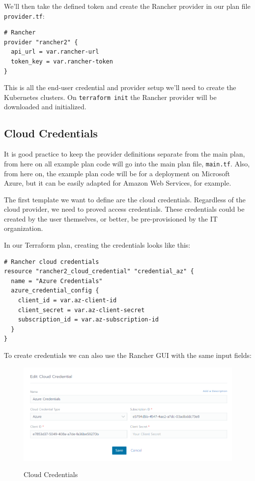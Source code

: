We'll then take the defined token and create the Rancher provider in our plan file \verb|provider.tf|:

\begin{lstlisting}[caption=Rancher Provider, frame=single, basicstyle=\ttfamily]
# Rancher
provider "rancher2" {
  api_url = var.rancher-url
  token_key = var.rancher-token
}
\end{lstlisting}

This is all the end-user credential and provider setup we'll need to create the Kubernetes clusters. On \verb|terraform init| the Rancher provider will be downloaded and initialized. 

\subsection{Cloud Credentials}

It is good practice to keep the provider definitions separate from the main plan, from here on all example plan code will go into the main plan file, \verb|main.tf|. Also, from here on, the example plan code will be for a deployment on Microsoft Azure, but it can be easily adapted for Amazon Web Services, for example.

The first template we want to define are the cloud credentials. Regardless of the cloud provider, we need to proved access credentials. These credentials could be created by the user themselves, or better, be pre-provisioned by the IT organization.

In our Terraform plan, creating the credentials looks like this:

\begin{lstlisting}[caption=Cloud Credentials, frame=single, basicstyle=\ttfamily]
# Rancher cloud credentials
resource "rancher2_cloud_credential" "credential_az" {
  name = "Azure Credentials"
  azure_credential_config {
    client_id = var.az-client-id
    client_secret = var.az-client-secret
    subscription_id = var.az-subscription-id
  }
}
\end{lstlisting}

To create credentials we can also use the Rancher GUI with the same input fields:

\begin{figure}[H]
\centering
\caption {Cloud Credentials}
\includegraphics[width=\linewidth]{images/cloud-credentials.png}
\label{fig:cloudCredentials}
\end{figure}

